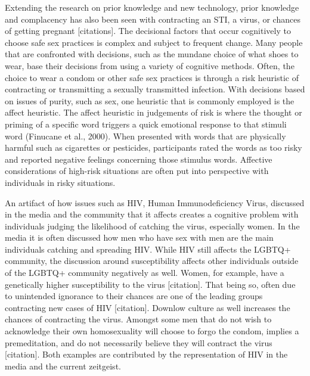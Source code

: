 \documentclass[
  english,
  donotrepeattitle,doc, 12pt, a4paper,floatsintext]{apa7}
\begin{document}
Extending the research on prior knowledge and new technology, prior knowledge and complacency has also been seen with contracting an STI, a virus, or chances of getting pregnant {[}citations{]}. The decisional factors that occur cognitively to choose safe sex practices is complex and subject to frequent change. Many people that are confronted with decisions, such as the mundane choice of what shoes to wear, base their decisions from using a variety of cognitive methods. Often, the choice to wear a condom or other safe sex practices is through a risk heuristic of contracting or transmitting a sexually transmitted infection. With decisions based on issues of purity, such as sex, one heuristic that is commonly employed is the affect heuristic. The affect heuristic in judgements of risk is where the thought or priming of a specific word triggers a quick emotional response to that stimuli word (Finucane et al., 2000). When presented with words that are physically harmful such as cigarettes or pesticides, participants rated the words as too risky and reported negative feelings concerning those stimulus words. Affective considerations of high-risk situations are often put into perspective with individuals in risky situations.

An artifact of how issues such as HIV, Human Immunodeficiency Virus, discussed in the media and the community that it affects creates a cognitive problem with individuals judging the likelihood of catching the virus, especially women. In the media it is often discussed how men who have sex with men are the main individuals catching and spreading HIV. While HIV still affects the LGBTQ+ community, the discussion around susceptibility affects other individuals outside of the LGBTQ+ community negatively as well. Women, for example, have a genetically higher susceptibility to the virus {[}citation{]}. That being so, often due to unintended ignorance to their chances are one of the leading groups contracting new cases of HIV {[}citation{]}. Downlow culture as well increases the chances of contracting the virus. Amongst some men that do not wish to acknowledge their own homosexuality will choose to forgo the condom, implies a premeditation, and do not necessarily believe they will contract the virus {[}citation{]}. Both examples are contributed by the representation of HIV in the media and the current zeitgeist.
\end{document}
